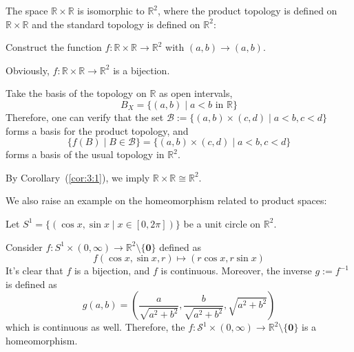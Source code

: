 \begin{example}
The space $\mathbb{R}\times\mathbb{R}$ is isomorphic to $\mathbb{R}^2$, where the product topology is defined on $\mathbb{R}\times\mathbb{R}$ and the standard topology is defined on $\mathbb{R}^2$:

Construct the function $f:\mathbb{R}\times\mathbb{R}\to\mathbb{R}^2$ with $(a,b)\to(a,b)$.

Obviously, $f:\mathbb{R}\times\mathbb{R}\to\mathbb{R}^2$ is a bijection.

Take the basis of the topology on $\mathbb{R}$ as open intervals,
\[
B_X=\{(a,b)\mid a<b\text{ in $\mathbb{R}$}\}
\]
Therefore, one can verify that the set $\mathcal{B}:=\{(a,b)\times(c,d)\mid a<b,c<d\}$ forms a basis for the product topology, and 
\[
\{f(B)\mid B\in\mathcal{B}\}=\{(a,b)\times(c,d)\mid a<b,c<d\}
\]
forms a basis of the usual topology in $\mathbb{R}^2$.

By Corollary~(\ref{cor:3:1}), we imply $\mathbb{R}\times\mathbb{R}\cong\mathbb{R}^2$.
\end{example}
We also raise an example on the homeomorphism related to product spaces:
\begin{example}
Let $S^1=\{(\cos x,\sin x\mid x\in[0,2\pi])\}$ be a unit circle on $\mathbb{R}^2$.

Consider $f: S^1\times(0,\infty)\to\mathbb{R}^2\setminus\{\bm0\}$ defined as
\[
f(\cos x,\sin x,r)\mapsto(r\cos x,r\sin x)
\]
It's clear that $f$ is a bijection, and $f$ is continuous. 
Moreover, the inverse $g:=f^{-1}$ is defined as
\[
g(a,b)=(\frac{a}{\sqrt{a^2+b^2}},\frac{b}{\sqrt{a^2+b^2}},\sqrt{a^2+b^2})
\]
which is continuous as well.
Therefore, the $f:\mathcal{S}^1\times(0,\infty)\to\mathbb{R}^2\setminus\{\bm0\}$ is a homeomorphism.
\end{example}
















